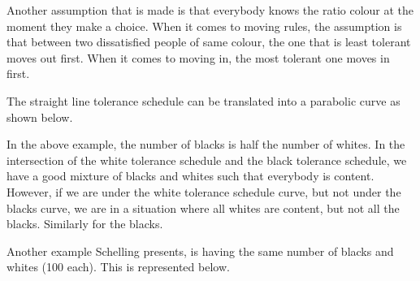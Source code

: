 \documentclass[../main.tex]{subfiles}
\begin{document}
Another assumption that is made is that everybody knows the ratio colour at the moment they make a choice. When it comes to moving rules, the assumption is that between two dissatisfied people of same colour, the one that is least tolerant moves out first. When it comes to moving in, the most tolerant one moves in first.

The straight line tolerance schedule can be translated into a parabolic curve as shown below. 


In the above example, the number of blacks is half the number of whites. In the intersection of the white tolerance schedule and the black tolerance schedule, we have a good mixture of blacks and whites such that everybody is content. However, if we are under the white tolerance schedule curve, but not under the blacks curve, we are in a situation where all whites are content, but not all the blacks. Similarly for the blacks.

Another example Schelling presents, is having the same number of blacks and whites (100 each). This is represented below. 

\end{document}

